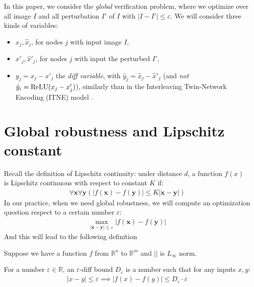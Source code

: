     In this paper, we consider the {\em global} verification problem, where we optimize over all image $I$ and all perturbation $I'$ of $I$ with $|I-I'| \leq \varepsilon$. 	We will consider three kinds of variables: 
    \begin{itemize}
    \item $x_j,\hat{x}_j$, for nodes $j$ with input image $I$, 
    \item $x'_j,\hat{x}'_j$, for nodes $j$ with input the perturbed $I'$, 
    \item  $y_j = x_j - x'_j$ the {\em diff variable}, with 
    $\hat{y}_j = \hat{x}_j - \hat{x}'_j$ (and {\em not} 
    $\hat{y}_i = \mathrm{ReLU}(x_j-x'_j)$), similarly than in the 
	Interleaving Twin-Network Encoding (ITNE) model \cite{lipshitz}. 
    \end{itemize}
     
	
	
	
	\iffalse
	
	\section{Global robustness and Lipschitz constant}
	
	
	Recall the definition of Lipschitz continuity:
	under distance $d$, a function $f(x)$ is Lipschitz continuous with respect to constant $K$ if:
	\begin{align*}
		\forall \boldsymbol{x} \forall\boldsymbol{y} (|f(\boldsymbol{x}) -f(\boldsymbol{y}) |\leq K|\boldsymbol{x}-\boldsymbol{y}|)
	\end{align*} 
	In our practice, when we need global robustness, we will compute an optimization question respect to a certain number $\varepsilon$:	\begin{align}\label{global_robustness}
		\max_{|\boldsymbol{x}-\boldsymbol{y}| \leq \varepsilon} |f(\boldsymbol{x}) -f(\boldsymbol{y}) |
	\end{align} And this will lead to the following definition
	
	\begin{definition}
		Suppose we have a function $f$ from $\mathbb{R}^n$ to $\mathbb{R}^m$ and $||$ is $L_\infty$ norm. 
		
		For a number $\varepsilon\in\mathbb{R}$, an $\varepsilon$-diff bound $D_\varepsilon$ is a number such that for any inputs $x,y$: \begin{align*}
			|x-y|\leq \varepsilon \implies |f(x)-f(y)| \leq D_\varepsilon \cdot \varepsilon
		\end{align*}
		
	\end{definition}
	
